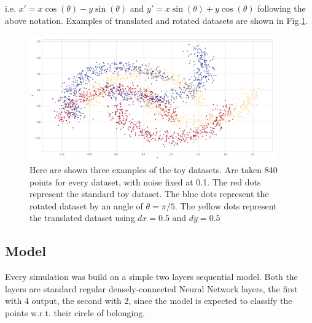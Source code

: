 \documentclass{article} %
\newcounter{points}
\newcounter{late}
\begin{document}
i.e. $x'=x\cos(\theta)-y\sin(\theta)$ and $y'=x\sin(\theta)+y\cos(\theta)$ following 
the above notation.
Examples of translated and rotated datasets are shown in Fig.\ref{fig2}.
\begin{figure}[!h]
    \centering
    \includegraphics[width=0.95\textwidth, keepaspectratio]{images/datasets_examples.png}
    \caption{Here are shown three examples of the toy datasets. Are taken 840 points for 
        every dataset, with noise fixed at 0.1. The red dots represent the standard toy 
        dataset. The blue dots represent the rotated dataset by an angle of $\theta=\pi/5$.
        The yellow dots represent the translated dataset using $dx=0.5$ and $dy=0.5$}
    \label{fig2}
\end{figure}

\subsection{Model}
Every simulation was build on a simple two layers sequential model.
Both the layers are standard regular densely-connected Neural Network layers, the first 
with 4 output, the second with 2, since the model is expected to classify the points 
w.r.t. their circle of belonging.
\end{document}
